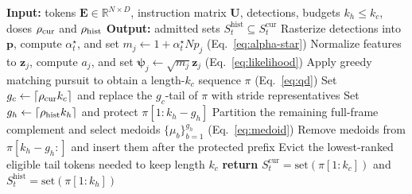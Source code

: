 \begin{algorithm}[tpb]
\caption{Admission-time Nested Selection for One Frame}
\label{alg:nested}
\begin{algorithmic}[1]
\STATE \textbf{Input:} tokens $\mathbf{E}\in\mathbb{R}^{N\times D}$, instruction matrix $\mathbf U$, detections, budgets $k_h\leq k_c$, doses $\rho_{\mathrm{cur}}$ and $\rho_{\mathrm{hist}}$
\STATE \textbf{Output:} admitted sets $S_t^{\mathrm{hist}}\subseteq S_t^{\mathrm{cur}}$
\STATE Rasterize detections into $\mathbf{p}$, compute $\alpha_t^\star$, and set $m_j\leftarrow 1+\alpha_t^\star Np_j$ \hfill (Eq.~\ref{eq:alpha-star})
\STATE Normalize features to $\mathbf{z}_j$, compute $a_j$, and set $\boldsymbol\psi_j\leftarrow\sqrt{m_j}\mathbf{z}_j$ \hfill (Eq.~\ref{eq:likelihood})
\STATE Apply greedy matching pursuit to obtain a length-$k_c$ sequence $\pi$ \hfill (Eq.~\ref{eq:qd})
\STATE Set $g_c\leftarrow\lceil\rho_{\mathrm{cur}} k_c\rceil$ and replace the $g_c$-tail of $\pi$ with stride representatives
\STATE Set $g_h\leftarrow\lceil\rho_{\mathrm{hist}} k_h\rceil$ and protect $\pi[1{:}k_h-g_h]$
\STATE Partition the remaining full-frame complement and select medoids $\{\mu_b\}_{b=1}^{g_h}$ \hfill (Eq.~\ref{eq:medoid})
\STATE Remove medoids from $\pi[k_h-g_h{:}]$ and insert them after the protected prefix
\STATE Evict the lowest-ranked eligible tail tokens needed to keep length $k_c$
\STATE \textbf{return} $S_t^{\mathrm{cur}}=\mathrm{set}(\pi[1{:}k_c])$ and $S_t^{\mathrm{hist}}=\mathrm{set}(\pi[1{:}k_h])$
\end{algorithmic}
\end{algorithm}

